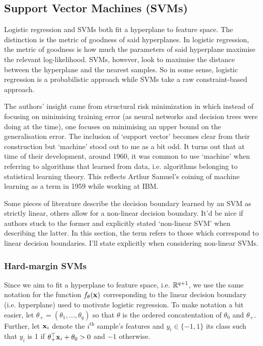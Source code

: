 \documentclass[11pt]{article}
\begin{document}
\subsection{Support Vector Machines (SVMs)}
Logistic regression and SVMs both fit a hyperplane to feature space. The distinction is the metric of goodness of said hyperplanes. In logistic regression, the metric of goodness is how much the parameters of said hyperplane maximise the relevant log-likelihood. SVMs, however, look to maximise the distance between the hyperplane and the nearest samples. So in some sense, logistic regression is a probabilistic approach while SVMs take a raw constraint-based approach.

The authors' insight came from structural risk minimization in which instead of focusing on minimising training error (as neural networks and decision trees were doing at the time), one focuses on minimising an upper bound on the generalisation error. The inclusion of `support vector' becomes clear from their construction but `machine' stood out to me as a bit odd. It turns out that at time of their development, around 1960, it was common to use `machine' when referring to algorithms that learned from data, i.e. algorithms belonging to statistical learning theory. This reflects Arthur Samuel's coining of machine learning as a term in 1959 while working at IBM.

\begin{tcolorbox}[title={\centering\textbf{Inconsistent terminology surrounding SVMs}}, colback=myLightBlue, colbacktitle=myDarkBlue, colframe=myDarkBlue, coltitle=white]
    Some pieces of literature describe the decision boundary learned by an SVM as strictly linear, others allow for a non-linear decision boundary. It'd be nice if authors stuck to the former and explicitly stated `non-linear SVM' when describing the latter. In this section, the term refers to those which correspond to linear decision boundaries. I'll state explicitly when considering non-linear SVMs.
\end{tcolorbox}

\subsubsection{Hard-margin SVMs}
Since we aim to fit a hyperplane to feature space, i.e. $\mathbb{R}^{q+1}$, we use the same notation for the function $f_{\theta}(\mathbf{x})$ corresponding to the linear decision boundary (i.e. hyperplane) used to motivate logistic regression. To make notation a bit easier, let $\theta_+=(\theta_1,\dots,\theta_q)$ so that $\theta$ is the ordered concatentation of $\theta_0$ and $\theta_+$. Further, let $\mathbf{x}_i$ denote the $i^{\text{th}}$ sample's features and $y_i\in\{-1,1\}$ its class such that $y_i$ is 1 if $\theta_+^\top \mathbf{x}_i+\theta_0>0$ and $-1$ otherwise.
\end{document}
